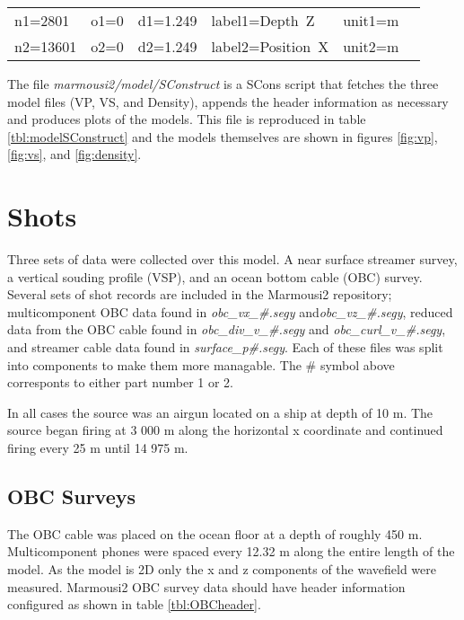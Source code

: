 {
\begin{tabular}[t]{|llllll|}
        \hline
        n1=2801    &   o1=0 &   d1=1.249    &    label1=Depth\ Z     &  unit1=m &  \\
        n2=13601   &   o2=0 &   d2=1.249    &    label2=Position\ X  &  unit2=m &  \\
        \hline
\end{tabular}
}


The file \emph{marmousi2\slash model\slash SConstruct} is a SCons script that fetches the three model files (VP, VS, and Density), 
appends the header information as necessary and produces plots of the models.  This file is reproduced in table 
\ref{tbl:modelSConstruct} and the models themselves are shown in figures \ref{fig:vp}, \ref{fig:vs}, and \ref{fig:density}.   

{
\tiny

\normalsize
}


\section{Shots}
Three sets of data were collected over this model.  A near surface streamer survey, a vertical souding profile (VSP), and 
an ocean bottom cable (OBC) survey.  Several sets of shot records are included in the Marmousi2 repository; 
multicomponent OBC data found in \emph{obc\_vx\_\#.segy} and\emph{obc\_vz\_\#.segy},  
reduced data from the OBC cable found in \emph{obc\_div\_v\_\#.segy} and \emph{obc\_curl\_v\_\#.segy}, and
streamer cable data found in \emph{surface\_p\#.segy}.  Each of these files was split into components to make them more 
managable.  The  \# symbol above corresponts to either part number 1 or 2. 

In all cases the source was an airgun located on a ship at depth of 10 m.  The source began firing at 3 000 m along the horizontal x 
coordinate and continued firing every 25 m until 14 975 m.  

\subsection{OBC Surveys}
The OBC cable was placed on the ocean floor at a depth of roughly 450 m.  Multicomponent phones were spaced every 12.32 m along the
entire length of the model.  As the model is 2D only the x and z components of the wavefield were measured.  
Marmousi2 OBC survey data should have header information configured as shown in table \ref{tbl:OBCheader}.

